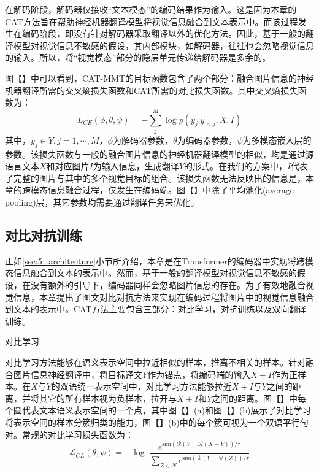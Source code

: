 在解码阶段，解码器仅接收“文本模态”的编码结果作为输入。这是因为本章的CAT方法旨在帮助神经机器翻译模型将视觉信息融合到文本表示中。而该过程发生在编码阶段，即没有针对解码器采取翻译以外的优化方法。因此，基于一般的翻译模型对视觉信息不敏感的假设，其内部模块，如解码器，往往也会忽略视觉信息的输入。所以，将“视觉模态”部分的隐层单元传递给解码器是多余的。

图【】中可以看到，CAT-MMT的目标函数包含了两个部分：融合图片信息的神经机器翻译所需的交叉熵损失函数和CAT所需的对比损失函数。其中交叉熵损失函数为：
\begin{equation}
    L_{CE}(\phi, \theta, \psi)=-\sum_j^M \log p(y_j|y_{<j},X,I)
\label{eq:5_cross_entropy}
\end{equation}
其中，$y_j \in Y,j=1,\cdots,M$，$\phi$为解码器参数，$\theta$为编码器参数，$\psi$为多模态嵌入层的参数。该损失函数与一般的融合图片信息的神经机器翻译模型的相似，均是通过源语言文本$X$和对应图片$I$为输入信息，生成翻译$Y$的形式。在我们的方案中，$I$代表了完整的图片与其中的多个视觉目标的组合。该损失函数无法反映出的信息是，本章的跨模态信息融合过程，仅发生在编码端。图【】中除了平均池化(average pooling)层，其它参数均需要通过翻译任务来优化。

\subsection{对比对抗训练}
\label{sec:5_cat}
正如\ref{sec:5_architecture}小节所介绍，本章是在Transformer的编码器中实现将跨模态信息融合到文本的表示中。然而，基于一般的翻译模型对视觉信息不敏感的假设，在没有额外的引导下，编码器同样会忽略图片信息的存在。为了有效地融合视觉信息，本章提出了图文对比对抗方法来实现在编码过程将图片中的视觉信息融合到文本的表示中。CAT方法主要包含三部分：对比学习，对抗训练以及双向翻译训练。

{\sffamily 对比学习}

对比学习方法能够在语义表示空间中拉近相似的样本，推离不相关的样本。针对融合图片信息神经翻译中，将目标译文$Y$作为锚点，将编码端的输入$X+I$作为正样本。在$X$与$Y$的双语统一表示空间中，对比学习方法能够拉近$X+I$与$Y$之间的距离，并将其它的所有样本视为负样本，拉开与$X+I$和$Y$之间的距离。图【】中每个圆代表文本语义表示空间的一个点，其中图【】(a)和图【】(b)展示了对比学习将表示空间的样本分簇归类的能力，图【】(b)中的每个簇可视为一个双语平行句对。常规的对比学习损失函数为：
\begin{equation}
    \mathcal{L}_{CL}(\theta, \psi)=-\log\ \frac{e^{\mathrm{sim}(\mathcal{R}(Y),\mathcal{R}(X+V))/\tau}}{\sum_{Z\in N}e^{\mathrm{sim}(\mathcal{R}(Y),\mathcal{R}(Z))/\tau}}
    \label{eq:5_contrastive_learning}
\end{equation}

